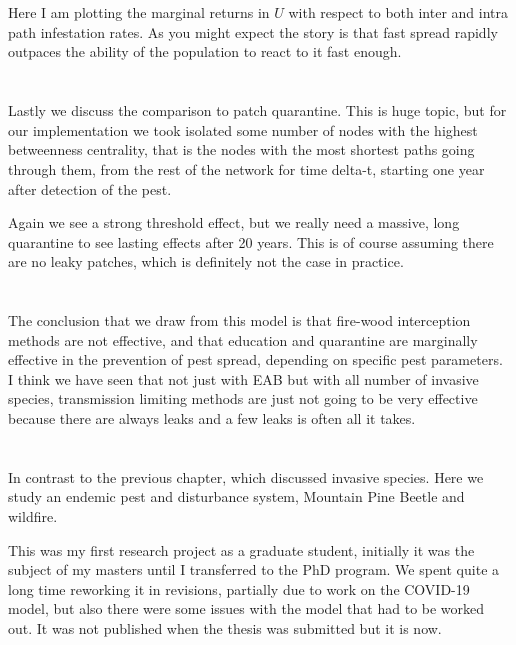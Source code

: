 \documentclass{article}
\begin{document}
\section{}

Here I am plotting the marginal returns in $U$ with respect to both inter and intra path infestation rates. As you might expect the story is that fast spread rapidly outpaces the ability of the population to react to it fast enough. 

\section{}

Lastly we discuss the comparison to patch quarantine. This is huge topic, but for our implementation we took isolated some number of nodes with the highest betweenness centrality, that is the nodes with the most shortest paths going through them, from the rest of the network for time delta-t, starting one year after detection of the pest.

Again we see a strong threshold effect, but we really need a massive, long quarantine to see lasting effects after 20 years. This is of course assuming there are no leaky patches, which is definitely not the case in practice.

\section{}

The conclusion that we draw from this model is that fire-wood interception methods are not effective, and that education and quarantine are marginally effective in the prevention of pest spread, depending on specific pest parameters. I think we have seen that not just with EAB but with all number of invasive species, transmission limiting methods are just not going to be very effective because there are always leaks and a few leaks is often all it takes. 

\section{}

In contrast to the previous chapter, which discussed invasive species. Here we study an endemic pest and disturbance system, Mountain Pine Beetle and wildfire. 

This was my first research project as a graduate student, initially it was the subject of my masters until I transferred to the PhD program. We spent quite a long time reworking it in revisions, partially due to work on the COVID-19 model, but also there were some issues with the model that had to be worked out. It was not published when the thesis was submitted but it is now.  
\end{document}
